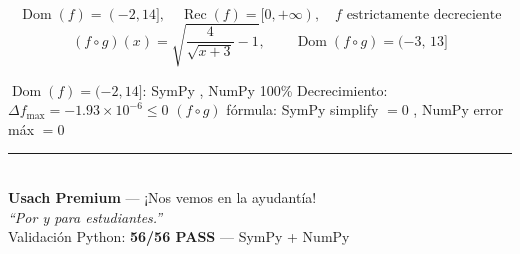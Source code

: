 \documentclass[letterpaper, 11pt]{article}
\begin{document}
\begin{resultado}
\[
    \operatorname{Dom}(f)=(-2,14],\quad
    \operatorname{Rec}(f)=[0,+\infty),\quad
    f \text{ estrictamente decreciente}
\]
\[
    (f\circ g)(x) = \sqrt{\dfrac{4}{\sqrt{x+3}}-1},\qquad
    \operatorname{Dom}(f\circ g)=(-3,\,13]
\]
\end{resultado}

\begin{verificacion}
$\operatorname{Dom}(f)=(-2,14]$: SymPy \checkmark, NumPy 100\% \checkmark\quad
Decrecimiento: $\Delta f_{\max}=-1.93\times10^{-6}\leq 0$ \checkmark\quad
$(f\circ g)$ fórmula: SymPy simplify $=0$ \checkmark, NumPy error máx $=0$ \checkmark
\end{verificacion}

\vspace{1.5cm}
\begin{center}
    {\color{azulFuerte}\rule{0.6\linewidth}{1pt}}\\[0.4cm]
    \small\textbf{Usach Premium} — ¡Nos vemos en la ayudantía! \\
    \textit{``Por y para estudiantes.''}\\[0.2cm]
    \small Validación Python: \textbf{56/56 PASS} — SymPy + NumPy
\end{center}
\end{document}
